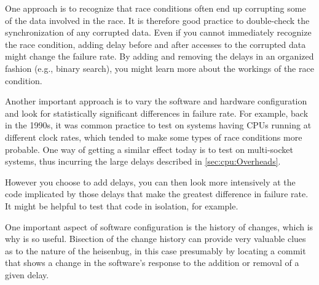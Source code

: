One approach is to recognize that race conditions often end up corrupting
some of the data involved in the race.
It is therefore good practice to double-check the synchronization of
any corrupted data.
Even if you cannot immediately recognize the race condition, adding
delay before and after accesses to the corrupted data might change
the failure rate.
By adding and removing the delays in an organized fashion (e.g., binary
search), you might learn more about the workings of the race condition.

\QuickQuizEnd

Another important approach is to
vary the software and hardware configuration and look for statistically
significant differences in failure rate.
For example, back in the 1990s, it was common practice to test on systems
having CPUs running at different clock rates, which tended to make some
types of race conditions more probable.
One way of getting a similar effect today is to test on multi-socket
systems, thus incurring the large delays described in
\cref{sec:cpu:Overheads}.

However you choose to add delays, you can then look more intensively at
the code implicated by those delays that make the greatest difference
in failure rate.
It might be helpful to test that code in isolation, for example.

One important aspect of software configuration is the history of
changes, which is why  is so useful.
Bisection of the change history can provide very valuable clues as
to the nature of the heisenbug, in this case presumably by locating
a commit that shows a change in the software's response to the addition
or removal of a given delay.

